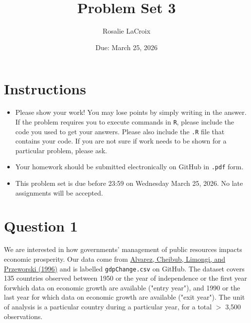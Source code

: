\documentclass[12pt,letterpaper]{article}
\title{Problem Set 3}
\date{Due: March 25, 2026}
\author{Rosalie LaCroix}
\begin{document}
	\maketitle
	\section*{Instructions}
	\begin{itemize}
	\item Please show your work! You may lose points by simply writing in the answer. If the problem requires you to execute commands in \texttt{R}, please include the code you used to get your answers. Please also include the \texttt{.R} file that contains your code. If you are not sure if work needs to be shown for a particular problem, please ask.
\item Your homework should be submitted electronically on GitHub in \texttt{.pdf} form.
\item This problem set is due before 23:59 on Wednesday March 25, 2026. No late assignments will be accepted.
	\end{itemize}

	\vspace{.25cm}
\section*{Question 1}
\vspace{.25cm}
\noindent We are interested in how governments' management of public resources impacts economic prosperity. Our data come from \href{https://www.researchgate.net/profile/Adam_Przeworski/publication/240357392_Classifying_Political_Regimes/links/0deec532194849aefa000000/Classifying-Political-Regimes.pdf}{Alvarez, Cheibub, Limongi, and Przeworski (1996)} and is labelled \texttt{gdpChange.csv} on GitHub. The dataset covers 135 countries observed between 1950 or the year of independence or the first year forwhich data on economic growth are available ("entry year"), and 1990 or the last year for which data on economic growth are available ("exit year"). The unit of analysis is a particular country during a particular year, for a total $>$ 3,500 observations. 
\end{document}
